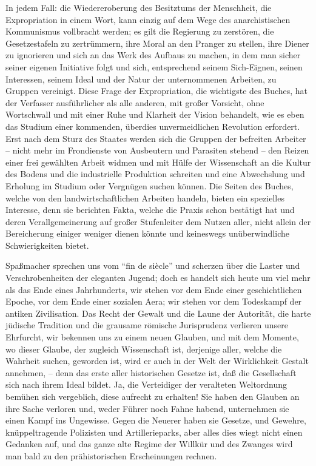 \documentclass{scrbook}
\begin{document}
In jedem Fall: die Wiedereroberung des Besitztums der Menschheit, die Expropriation in einem Wort, kann einzig auf dem Wege des anarchistischen Kommunismus vollbracht werden; es gilt die Regierung zu zerstören, die Gesetzestafeln zu zertrümmern, ihre Moral an den Pranger zu stellen, ihre Diener zu ignorieren und sich an das Werk des Aufbaus zu machen, in dem man sicher seiner eigenen Initiative folgt und sich, entsprechend seinem Sich-Eignen, seinen Interessen, seinem Ideal und der Natur der unternommenen Arbeiten, zu Gruppen vereinigt. Diese Frage der Expropriation, die wichtigste des Buches, hat der Verfasser ausführlicher als alle anderen, mit großer Vorsicht, ohne Wortschwall und mit einer Ruhe und Klarheit der Vision behandelt, wie es eben das Studium einer kommenden, überdies unvermeidlichen Revolution erfordert. Erst nach dem Sturz des Staates werden sich die Gruppen der befreiten Arbeiter – nicht mehr im Frondienste von Ausbeutern und Parasiten stehend – den Reizen einer frei gewählten Arbeit widmen und mit Hülfe der Wissenschaft an die Kultur des Bodens und die industrielle Produktion schreiten und eine Abwechslung und Erholung im Studium oder Vergnügen suchen können. Die Seiten des Buches, welche von den landwirtschaftlichen Arbeiten handeln, bieten ein spezielles Interesse, denn sie berichten Fakta, welche die Praxis schon bestätigt hat und deren Verallgemeinerung auf großer Stufenleiter dem Nutzen aller, nicht allein der Bereicherung einiger weniger dienen könnte und keineswegs unüberwindliche Schwierigkeiten bietet.

Spaßmacher sprechen uns vom ``fin de siècle'' und scherzen über die Laster und Verschrobenheiten der eleganten Jugend; doch es handelt sich heute um viel mehr als das Ende eines Jahrhunderts, wir stehen vor dem Ende einer geschichtlichen Epoche, vor dem Ende einer sozialen Aera; wir stehen vor dem Todeskampf der antiken Zivilisation. Das Recht der Gewalt und die Laune der Autorität, die harte jüdische Tradition und die grausame römische Jurisprudenz verlieren unsere Ehrfurcht, wir bekennen uns zu einem neuen Glauben, und mit dem Momente, wo dieser Glaube, der zugleich Wissenschaft ist, derjenige aller, welche die Wahrheit suchen, geworden ist, wird er auch in der Welt der Wirklichkeit Gestalt annehmen, – denn das erste aller historischen Gesetze ist, daß die Gesellschaft sich nach ihrem Ideal bildet. Ja, die Verteidiger der veralteten Weltordnung bemühen sich vergeblich, diese aufrecht zu erhalten! Sie haben den Glauben an ihre Sache verloren und, weder Führer noch Fahne habend, unternehmen sie einen Kampf ins Ungewisse. Gegen die Neuerer haben sie Gesetze, und Gewehre, knüppeltragende Polizisten und Artillerieparks, aber alles dies wiegt nicht einen Gedanken auf, und das ganze alte Regime der Willkür und des Zwanges wird man bald zu den prähistorischen Erscheinungen rechnen.
\end{document}
